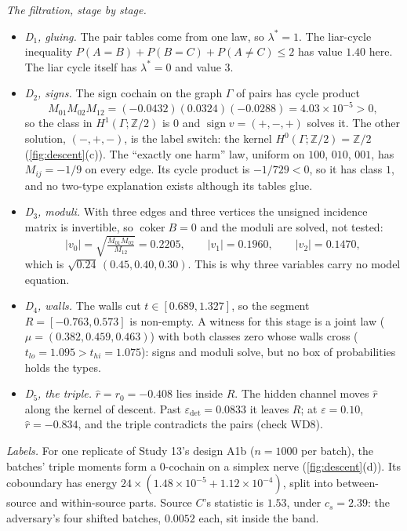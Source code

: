 \documentclass[11pt]{article}
\theoremstyle{definition}\newtheorem{definition}{Definition}\newtheorem{remark}{Remark}
\begin{document}
\emph{The filtration, stage by stage.}
\begin{itemize}
\item \emph{D$_1$, gluing.} The pair tables come from one law, so $\lambda^*=1$. The liar-cycle inequality
  $P(A{=}B)+P(B{=}C)+P(A{\ne}C)\le2$ has value $1.40$ here. The liar cycle itself has $\lambda^*=0$ and value $3$.
\item \emph{D$_2$, signs.} The sign cochain on the graph $\Gamma$ of pairs has cycle product
  \[
  M_{01}M_{02}M_{12}=(-0.0432)(0.0324)(-0.0288)=4.03\times10^{-5}>0,
  \]
  so the class in $H^1(\Gamma;\mathbb Z/2)$ is $0$ and $\operatorname{sign}v=(+,-,+)$ solves it. The other solution, $(-,+,-)$, is the label
  switch: the kernel $H^0(\Gamma;\mathbb Z/2)=\mathbb Z/2$ (\cref{fig:descent}(c)). The ``exactly one harm'' law, uniform on $100$, $010$,
  $001$, has $M_{ij}=-1/9$ on every edge. Its cycle product is $-1/729<0$, so it has class $1$, and no two-type explanation exists
  although its tables glue.
\item \emph{D$_3$, moduli.} With three edges and three vertices the unsigned incidence matrix is invertible, so $\operatorname{coker}B=0$
  and the moduli are solved, not tested:
  \[
  |v_0|=\sqrt{\tfrac{M_{01}M_{02}}{M_{12}}}=0.2205,\qquad |v_1|=0.1960,\qquad |v_2|=0.1470,
  \]
  which is $\sqrt{0.24}\,(0.45,0.40,0.30)$. This is why three variables carry no model equation.
\item \emph{D$_4$, walls.} The walls cut $t\in[0.689,1.327]$, so the segment $R=[-0.763,0.573]$ is non-empty. A witness for this
  stage is a joint law ($\mu=(0.382,0.459,0.463)$) with both classes zero whose walls cross ($t_{lo}=1.095>t_{hi}=1.075$): signs and
  moduli solve, but no box of probabilities holds the types.
\item \emph{D$_5$, the triple.} $\hat r=r_0=-0.408$ lies inside $R$. The hidden channel moves $\hat r$ along the kernel of descent. Past
  $\varepsilon_{\det}=0.0833$ it leaves $R$; at $\varepsilon=0.10$, $\hat r=-0.834$, and the triple contradicts the pairs (check WD8).
\end{itemize}

\emph{Labels.} For one replicate of Study 13's design A1b ($n=1000$ per batch), the batches' triple moments form a $0$-cochain on a
simplex nerve (\cref{fig:descent}(d)). Its coboundary has energy $24\times(1.48\times10^{-5}+1.12\times10^{-4})$, split into
between-source and within-source parts. Source $C$'s statistic is $1.53$, under $c_s=2.39$: the adversary's four shifted batches,
$0.0052$ each, sit inside the band.
\end{document}
